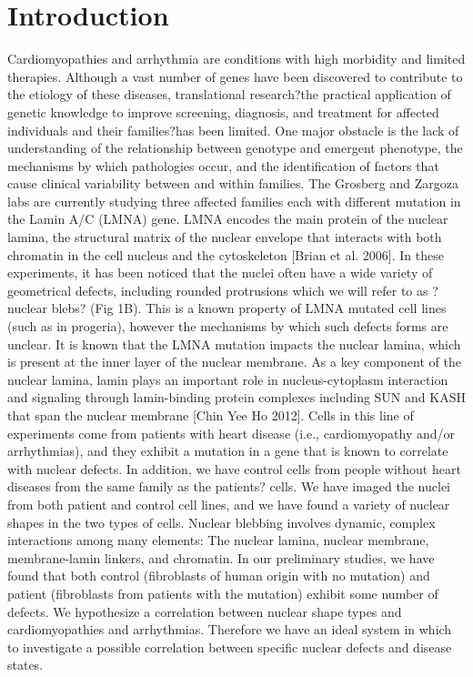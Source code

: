 \section{Introduction}
Cardiomyopathies and arrhythmia are conditions with high morbidity and limited therapies. Although a vast number of genes have been discovered to contribute to the etiology of these diseases, translational research?the practical application of genetic knowledge to improve screening, diagnosis, and treatment for affected individuals and their families?has been limited. One major obstacle is the lack of understanding of the relationship between genotype and emergent phenotype, the mechanisms by which pathologies occur, and the identification of factors that cause clinical variability between and within families. The Grosberg and Zargoza labs are currently studying three affected families each with different mutation in the Lamin A/C (LMNA) gene.  LMNA encodes the main protein of the nuclear lamina, the structural matrix of the nuclear envelope that interacts with both chromatin in the cell nucleus and the cytoskeleton [Brian et al. 2006]. In these experiments, it has been noticed that the nuclei often have a wide variety of geometrical defects, including rounded protrusions which we will refer to as ?nuclear blebs? (Fig 1B). This is a known property of LMNA mutated cell lines (such as in progeria), however the mechanisms by which such defects forms are unclear. It is known that the LMNA mutation impacts the nuclear lamina, which is present at the inner layer of the nuclear membrane. As a key component of the nuclear lamina, lamin plays an important role in nucleus-cytoplasm interaction and signaling through lamin-binding protein complexes including SUN and KASH that span the nuclear membrane [Chin Yee Ho 2012]. Cells in this line of experiments come from patients with heart disease (i.e., cardiomyopathy and/or arrhythmias), and they exhibit a mutation in a gene that is known to correlate with nuclear defects. In addition, we have control cells from people without heart diseases from the same family as the patients? cells.  We have imaged the nuclei from both patient and control cell lines, and we have found a variety of nuclear shapes in the two types of cells. Nuclear blebbing involves dynamic, complex interactions among many elements: The nuclear lamina, nuclear membrane, membrane-lamin linkers, and chromatin. In our preliminary studies, we have found that both control (fibroblasts of human origin with no mutation) and patient (fibroblasts from patients with the mutation) exhibit some number of defects. We hypothesize a correlation between nuclear shape types and cardiomyopathies and arrhythmias. Therefore we have an ideal system in which to investigate a possible correlation between specific nuclear defects and disease states.

